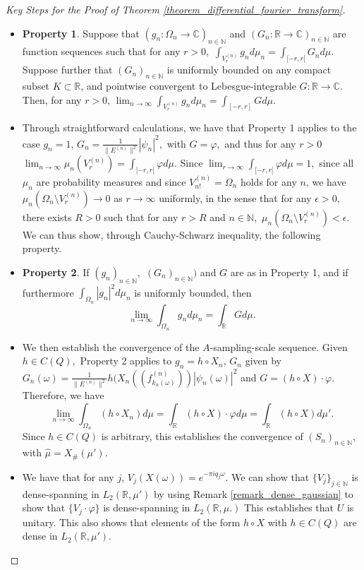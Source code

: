 \documentclass[10pt,a4paper]{amsart}
\def \HMU{\hat{\mu}}
\begin{document}
\begin{proof}[Key Steps for the Proof of Theorem \ref{theorem_differential_fourier_transform}]
\begin{itemize}
		\item \textbf{Property 1}. Suppose that $(g_n:\Omega_n\rightarrow\mathbb{C})_{n\in\mathbb{N}}$ and $(G_n:\mathbb{R}\rightarrow\mathbb{C})_{n\in\mathbb{N}}$ are function sequences such that for any $r>0,$ $\int_{V_r^{(n)}}g_nd\mu_n=\int_{[-r,r[} G_nd\mu.$ Suppose further that $(G_n)_{n\in\mathbb{N}}$ is uniformly bounded on any compact subset $K\subset\mathbb{R}$, and pointwise convergent to Lebesgue-integrable $G:\mathbb{R}\rightarrow\mathbb{C}.$ Then, for any $r>0$, $\lim_{n\rightarrow\infty}\int_{V_r^{(n)}}g_nd\mu_n=\int_{[-r,r]} Gd\mu.$
		\item Through straightforward calculations, we have that Property 1 applies to the case $g_n=1$, $G_n=\frac{1}{\|E^{(n)}\|^2}|\psi_n|^2,$ with $G=\varphi,$ and thus for any $r>0$ $\lim_{n\rightarrow\infty}\mu_n(V_r^{(n)})=\int_{[-r,r[}\varphi d\mu.$ Since $\lim_{r\rightarrow\infty}\int_{[-r,r[}\varphi d\mu=1,$ since all $\mu_n$ are probability measures and since $V_{n!}^{(n)}=\Omega_n$ holds for any $n$, we have $\mu_n(\Omega_n\setminus V_r^{(n)})\rightarrow 0$ as $r\rightarrow\infty$ uniformly, in the sense that for any $\epsilon>0,$ there exists $R>0$ such that for any $r>R$ and $n\in\mathbb{N},$  $\mu_n(\Omega_n\setminus V_r^{(n)})<\epsilon.$ We can thus show, through Cauchy-Schwarz inequality, the following property.
		\item \textbf{Property 2}. If $(g_n)_{n\in\mathbb{N}},$ $(G_n)_{n\in\mathbb{N}})$ and $G$ are as in Property 1, and if furthermore $\int_{\Omega_n}|g_n|^2d\mu_n$ is uniformly bounded, then $$\lim_{n\rightarrow\infty} \int_{\Omega_n} g_nd\mu_n=\int_{\mathbb{R}} Gd\mu.$$ 
		\item We then establish the convergence of the $A$-sampling-scale sequence. Given $h\in C(Q),$ Property 2 applies to $g_n=h\circ X_n$, $G_n$ given by $G_n(\omega)=\frac{1}{\|E^{(n)}\|^2}h(X_n((f_{k_n(\omega)}^{(n)}))|\psi_n(\omega)|^2$ and $G=(h\circ X)\cdot \varphi.$ Therefore, we have $$\lim_{n\rightarrow\infty}\int_{\Omega_n}(h\circ X_n)d\mu=\int_{\mathbb{R}} (h\circ X)\cdot\varphi d\mu=\int_{\mathbb{R}} (h\circ X)d\mu'.$$ Since  $h\in C(Q)$ is arbitrary, this establishes the convergence of $(S_n)_{n\in\mathbb{N}},$ with $\HMU=X_{\#}(\mu').$ 
		\item We have that for any $j$, $V_j(X(\omega))=e^{-\pi i q_j \omega}$. We can show that $\{V_j\}_{j\in\mathbb{N}}$ is dense-spanning in $L_2(\mathbb{R},\mu')$ by using Remark \ref{remark_dense_gaussian} to show that $\{V_j\cdot\varphi\}$ is dense-spanning in $L_2(\mathbb{R},\mu.)$ This establishes that $U$ is unitary. This also shows that elements of the form $h\circ X$ with $h\in C(Q)$ are dense in $L_2(\mathbb{R},\mu').$

\end{itemize}
\end{proof}
\end{document}
